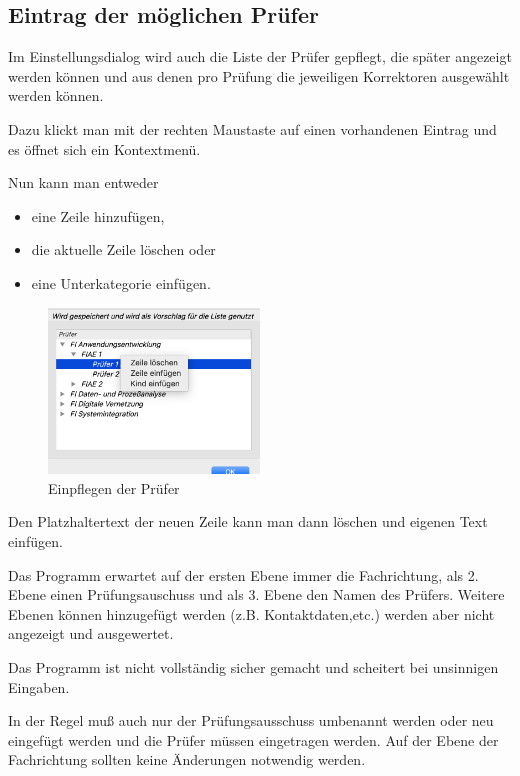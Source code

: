 \documentclass[a4paper,notitlepage,parskip=half]{scrartcl}
\begin{document}
\subsection{Eintrag der möglichen Prüfer}
Im Einstellungsdialog wird auch die Liste der Prüfer gepflegt, die später angezeigt werden können und aus denen pro Prüfung die jeweiligen Korrektoren ausgewählt werden können.

Dazu klickt man mit der rechten Maustaste auf einen vorhandenen Eintrag und es öffnet sich ein Kontextmenü.

Nun kann man entweder

\begin{itemize}
\item eine Zeile hinzufügen,
\item die aktuelle Zeile löschen oder
\item eine Unterkategorie einfügen. 
\end{itemize}

\begin{figure}[ht]
  \centering
  \includegraphics[width=0.5\textwidth]{Einstellungen2.png}
  \caption{Einpflegen der Prüfer}
  \label{fig:einstellungen2}
\end{figure}

Den Platzhaltertext der neuen Zeile kann man dann löschen und eigenen Text einfügen.

\begin{marker}
Das Programm erwartet auf der ersten Ebene immer die Fachrichtung, als 2. Ebene einen Prüfungsauschuss und als 3. Ebene den Namen des Prüfers. Weitere Ebenen können hinzugefügt werden (z.B. Kontaktdaten,etc.) werden aber nicht angezeigt und ausgewertet.
\end{marker}

Das Programm ist nicht vollständig sicher gemacht und scheitert bei unsinnigen Eingaben.

In der Regel muß auch nur der Prüfungsausschuss umbenannt werden oder neu eingefügt werden und die Prüfer müssen eingetragen werden. Auf der Ebene der Fachrichtung sollten keine Änderungen notwendig werden.
\end{document}
